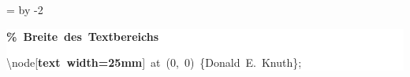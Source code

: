 \begingroup
\ttfamily
{}
=\textwidth
\advance{} by -2\fboxsep
\noindent
\colorbox{background}
{%
\parbox{\dimen255}
{%
\rule[-0.5ex]{0pt}{2.5ex}\hspace*{0.0em}\textcolor{G}{\textbf{\%~Breite~des~Textbereichs}}\\
\rule[-0.5ex]{0pt}{2.5ex}\hspace*{0.0em}\textbackslash{}node[\textcolor{R}{\textbf{text~width=25mm}}]~at~(0,~0)~\{Donald~E.~Knuth\};}%
}%
\endgroup
